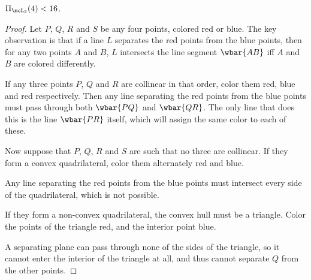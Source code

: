 \begin{theorem*} \label{thm:vc:2}
    $\Pi_{\mcL_2}(4) < 16$.
\end{theorem*}
\begin{proof}
    Let $P$, $Q$, $R$ and $S$ be any four points, colored red or blue.
    The key observation is that if a line $L$ separates the red points
    from the blue points, then for any two points $A$ and $B$,
    $L$ intersects the line segment $\wbar{AB}$ iff $A$ and $B$ are
    colored differently.

    If any three points $P$, $Q$ and $R$ are collinear in that order,
    color them red, blue and red respectively.
    Then any line separating the red points from the blue points must pass
    through both $\wbar{PQ}$ and $\wbar{QR}$.
    The only line that does this is the line $\wbar{PR}$ itself, which
    will assign the same color to each of these.

    Now suppose that $P$, $Q$, $R$ and $S$ are such that no three are
    collinear.
    If they form a convex quadrilateral,
    color them alternately red and blue.
    \begin{center}
    \end{center}
    Any line separating the red points from the blue points must intersect
    every side of the quadrilateral, which is not possible.

    If they form a non-convex quadrilateral, the convex hull must be a
    triangle.
    Color the points of the triangle red, and the interior point blue.
    \begin{center}
    \end{center}
    A separating plane can pass through none of the sides of the triangle,
    so it cannot enter the interior of the triangle at all, and thus
    cannot separate $Q$ from the other points.
\end{proof}

